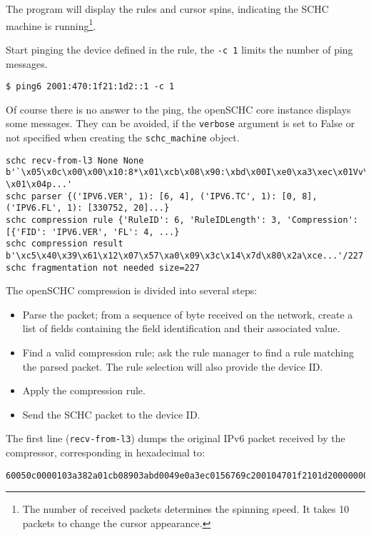 \documentclass[onecolumn,12pt]{book}
\newcounter{c}
\begin{document}
The program will display the rules and cursor spins, indicating the SCHC machine is running\footnote{The number of received packets determines the spinning speed. It takes 10 packets to change the cursor appearance.}. 

Start pinging the device defined in the rule, the \texttt{-c 1} limits the number of ping messages. 

\begin{lstlisting}
$ ping6 2001:470:1f21:1d2::1 -c 1
\end{lstlisting}

Of course there is no answer to the ping, the openSCHC core instance displays some messages. They can be avoided, if the \texttt{verbose} argument is set to False or not specified when creating the \texttt{schc\_machine} object. 

\begin{lstlisting}[basicstyle=\ttfamily\tiny]
schc recv-from-l3 None None b'`\x05\x0c\x00\x00\x10:8*\x01\xcb\x08\x90:\xbd\x00I\xe0\xa3\xec\x01Vv\x9c \x01\x04p...'
schc parser {('IPV6.VER', 1): [6, 4], ('IPV6.TC', 1): [0, 8], ('IPV6.FL', 1): [330752, 20]...} 
schc compression rule {'RuleID': 6, 'RuleIDLength': 3, 'Compression': [{'FID': 'IPV6.VER', 'FL': 4, ...}
schc compression result b'\xc5\x40\x39\x61\x12\x07\x57\xa0\x09\x3c\x14\x7d\x80\x2a\xce...'/227
schc fragmentation not needed size=227
\end{lstlisting}
 
The openSCHC compression is divided into several steps:
\begin{itemize}
\item Parse the packet; from a sequence of byte received on the network, create a list of fields containing the field identification and their associated value.
\item Find a valid compression rule; ask the rule manager to find a rule matching the parsed packet. The rule selection will also provide the device ID.
\item Apply the compression rule.
\item Send the SCHC packet to the device ID.
\end{itemize}

The first line (\texttt{recv-from-l3}) dumps the original IPv6 packet received by the compressor, corresponding in hexadecimal to:

\begin{lstlisting}[basicstyle=\ttfamily\tiny]
60050c0000103a382a01cb08903abd0049e0a3ec0156769c200104701f2101d20000000000000001800051fb48b20000609f882600060ed2
\end{lstlisting}
\end{document}
